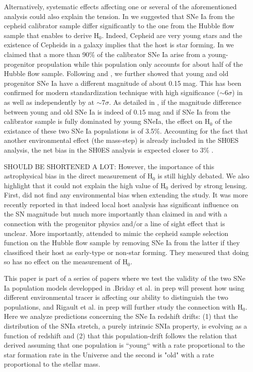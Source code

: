 \documentclass[bibnumber]{aa}
\begin{document}
Alternatively, systematic effects affecting one or several of the aforementioned
analysis could also explain the tension. In \cite{rigault2015} we suggested that
SNe Ia from the cepheid calibrator sample differ significantly to the one from
the Hubble flow sample that enables to derive H$_0$. Indeed, Cepheid are very
young stars and the existence of Cepheids in a galaxy implies that the host is
star forming. In \citep{Rigault2015} we claimed that a more than 90\% of the
calibrator SNe Ia arise from a young-progenitor propulation while this
population only accounts for about half of the Hubble flow sample. Following
\cite{sullivan2010} and \citep{rigault2013}, we further showed that young and
old progenitor SNe Ia have a different magnitude of about 0.15 mag. This has
been confirmed for modern standardization technique
\citep[SALT2.4][]{guy2010,betoule2014} with high significance ($\sim 6\sigma$)
in \citep{rigault2018} as well as independently by \cite{roman2019} at $\sim
7\sigma$. As detailed in \citep{Rigault2015}, if the magnitude difference
between young and old SNe Ia is indeed of $0.15$ mag and if SNe Ia from the
calibrator sample is fully dominated by young SNeIa, the effect on H$_0$ of the
existance of these two SNe Ia populations is of 3.5\%. Accounting for the fact
that another environmental effect (the mass-step) is already included in the
SH0ES analysis, the net bias in the SH0ES analysis is expected closer to 3\%
\citep[see table 6 of ][]{rigault2015}. 

SHOULD BE SHORTENED A LOT: However, the importance of this astrophysical bias in
the direct measurement of H$_0$ is still highly debated. We also highlight that
it could not explain the high value of H$_0$ derived by strong lensing. First,
\cite{jones2015} did not find any environmental bias when extending the
\citep{rigault2015} study. It was more recently reported in \citep{jones2019}
that indeed local host analysis has significant influence on the SN magnitude
but much more importantly than claimed in \citep{rigault2018} and with a
connection with the progenitor physics and/or a line of sight effect that is
unclear. More importantly, \cite{riess2016} attended to mimic the cepheid sample
selection function on the Hubble flow sample by removing SNe Ia from the latter
if they classificed their host as early-type or non-star forming. They measured
that doing so has no effect on the measurement of H$_0$.

This paper is part of a series of papers where we test the validity of the two
SNe Ia population models developped in \citep{rigault2018}.Briday et al. in prep
will present how using different environmental tracer is affecting our ability
to distinguish the two populations, and Rigault et al. in prep will further
study the connection with H$_0$. Here we analyze predictions concerning the
SNe Ia redshift drifts: (1) that the distribution of the SNIa stretch, a purely
intrinsic SNIa property, is evolving as a function of redshift and (2) that this
population-drift follows the relation that \citep{rigault2018} derived assuming
that one population is “young“ with a rate proportional to the star formation
rate in the Universe and the second is "old" with a rate proportional to the
stellar mass.
\end{document}
